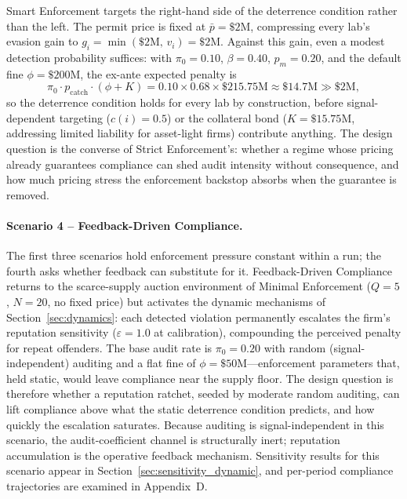 Smart Enforcement targets the right-hand side of the deterrence condition rather than the left. The permit price is fixed at $\bar{p} = \$2$M, compressing every lab's evasion gain to $g_i = \min(\$2\text{M},\,v_i) = \$2\text{M}$. Against this gain, even a modest detection probability suffices: with $\pi_0 = 0.10$, $\beta = 0.40$, $p_m = 0.20$, and the default fine $\phi = \$200$M, the ex-ante expected penalty is
%
\[
  \pi_0 \cdot p_{\mathrm{catch}} \cdot (\phi + K)
  = 0.10 \times 0.68 \times \$215.75\text{M}
  \approx \$14.7\text{M} \gg \$2\text{M},
\]
%
so the deterrence condition holds for every lab by construction, before signal-dependent targeting ($c(i) = 0.5$) or the collateral bond ($K = \$15.75$M, addressing limited liability for asset-light firms) contribute anything. The design question is the converse of Strict Enforcement's: whether a regime whose pricing already guarantees compliance can shed audit intensity without consequence, and how much pricing stress the enforcement backstop absorbs when the guarantee is removed.

\paragraph{Scenario 4 -- Feedback-Driven Compliance.}

The first three scenarios hold enforcement pressure constant within a run; the fourth asks whether feedback can substitute for it. Feedback-Driven Compliance returns to the scarce-supply auction environment of Minimal Enforcement ($Q = 5$, $N = 20$, no fixed price) but activates the dynamic mechanisms of Section~\ref{sec:dynamics}: each detected violation permanently escalates the firm's reputation sensitivity ($\varepsilon = 1.0$ at calibration), compounding the perceived penalty for repeat offenders. The base audit rate is $\pi_0 = 0.20$ with random (signal-independent) auditing and a flat fine of $\phi = \$50$M---enforcement parameters that, held static, would leave compliance near the supply floor. The design question is therefore whether a reputation ratchet, seeded by moderate random auditing, can lift compliance above what the static deterrence condition predicts, and how quickly the escalation saturates. Because auditing is signal-independent in this scenario, the audit-coefficient channel is structurally inert; reputation accumulation is the operative feedback mechanism. Sensitivity results for this scenario appear in Section~\ref{sec:sensitivity_dynamic}, and per-period compliance trajectories are examined in Appendix~D.

